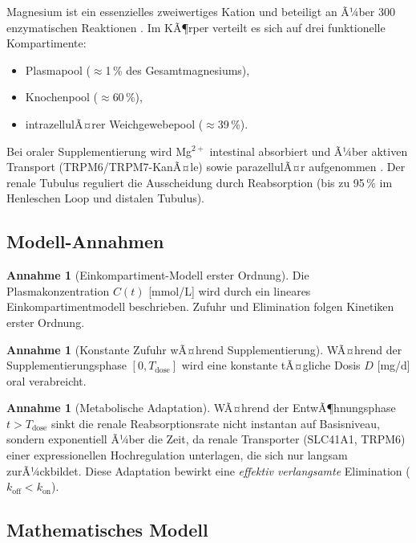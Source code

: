 ﻿\documentclass[12pt,a4paper]{article}
\theoremstyle{plain}
\theoremstyle{definition}
\newtheorem{assumption}[theorem]{Annahme}
\theoremstyle{remark}
\begin{document}
Magnesium ist ein essenzielles zweiwertiges Kation und beteiligt an Ã¼ber
300 enzymatischen Reaktionen \cite{DiNicolantonio2018}. Im KÃ¶rper verteilt es
sich auf drei funktionelle Kompartimente:
\begin{itemize}
  \item Plasmapool ($\approx$1\,\% des Gesamtmagnesiums),
  \item Knochenpool ($\approx$60\,\%),
  \item intrazellulÃ¤rer Weichgewebepool ($\approx$39\,\%).
\end{itemize}

Bei oraler Supplementierung wird Mg$^{2+}$ intestinal absorbiert und Ã¼ber
aktiven Transport (TRPM6/TRPM7-KanÃ¤le) sowie parazellulÃ¤r aufgenommen
\cite{Schuchardt2017}. Der renale Tubulus reguliert die Ausscheidung durch
Reabsorption (bis zu 95\,\% im Henleschen Loop und distalen Tubulus).

\subsection{Modell-Annahmen}

\begin{assumption}[Einkompartiment-Modell erster Ordnung]
\label{ass:onecomp}
Die Plasmakonzentration $C(t)$ [\si{mmol/L}] wird durch ein lineares
Einkompartimentmodell beschrieben. Zufuhr und Elimination folgen
Kinetiken erster Ordnung.
\end{assumption}

\begin{assumption}[Konstante Zufuhr wÃ¤hrend Supplementierung]
\label{ass:dose}
WÃ¤hrend der Supplementierungsphase $[0, T_\text{dose}]$ wird eine konstante
tÃ¤gliche Dosis $D$ [\si{mg/d}] oral verabreicht.
\end{assumption}

\begin{assumption}[Metabolische Adaptation]
\label{ass:adapt}
WÃ¤hrend der EntwÃ¶hnungsphase $t > T_\text{dose}$ sinkt die renale
Reabsorptionsrate nicht instantan auf Basisniveau, sondern exponentiell Ã¼ber
die Zeit, da renale Transporter (SLC41A1, TRPM6) einer expressionellen
Hochregulation unterlagen, die sich nur langsam zurÃ¼ckbildet.
Diese Adaptation bewirkt eine \emph{effektiv verlangsamte} Elimination
($k_\text{off} < k_\text{on}$).
\end{assumption}

\subsection{Mathematisches Modell}
\end{document}
